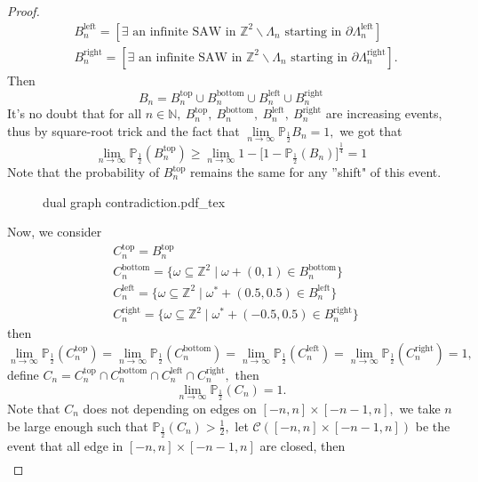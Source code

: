 \documentclass[12pt,a4paper]{report}
\theoremstyle{definition}
\newcommand{\incfig}[1]{%
{#1.pdf_tex}
}
\begin{document}
\begin{enumerate}
\begin{proof}
\begin{align*}
        &B_n^{\mathrm{left}}=[\exists\mbox{ an infinite SAW in }\mathbb{Z}^2\backslash\Lambda_n\mbox{ starting in }\partial\Lambda_n^\mathrm{left}]\\
        &B_n^{\mathrm{right}}=[\exists\mbox{ an infinite SAW in }\mathbb{Z}^2\backslash\Lambda_n\mbox{ starting in }\partial\Lambda_n^\mathrm{right}].
    \end{align*}
    Then
    \[
    B_n=B_n^{\mathrm{top}}\cup B_n^{\mathrm{bottom}}\cup B_n^{\mathrm{left}}\cup B_n^{\mathrm{right}}
    \]
	It's no doubt that for all $n\in\mathbb{N},\ B_n^{\mathrm{top}},\ B_n^{\mathrm{bottom}},\ B_n^{\mathrm{left}},\ B_n^{\mathrm{right}}$ are increasing events, thus by square-root trick and the fact that $\lim\limits_{n\to\infty}\mathbb{P}_{\frac{1}{2}}B_n=1,$ we got that
	\[
	\lim_{n\to\infty}\mathbb{P}_{\frac{1}{2}}(B_n^\mathrm{top})\geq\lim_{n\to\infty}1-\Big[1-\mathbb{P}_{\frac{1}{2}}(B_n)\Big]^\frac{1}{4}=1
	\]
	Note that the probability of $B_n^\mathrm{top}$ remains the same for any ''shift" of this event.
	\begin{figure}[htp]
	\centering
	\def\svgwidth{7cm}
	\incfig{dual graph contradiction}
	\end{figure}
	\newpage
	Now, we consider 
	\begin{align*}
        &C_n^{\mathrm{top}}=B_n^\mathrm{top}\\
        &C_n^{\mathrm{bottom}}=\{\omega\subseteq \mathbb{Z}^2\mid \omega+(0,1)\in B_n^\mathrm{bottom}\}\\
        &C_n^{\mathrm{left}}=\{\omega\subseteq \mathbb{Z}^2\mid \omega^*+(0.5,0.5)\in B_n^\mathrm{left}\}\\
        &C_n^{\mathrm{right}}=\{\omega\subseteq \mathbb{Z}^2\mid \omega^*+(-0.5,0.5)\in B_n^\mathrm{right}\}
	\end{align*}
	then
	\[
	\lim_{n\to\infty}\mathbb{P}_{\frac{1}{2}}(C_n^{\mathrm{top}})=\lim_{n\to\infty}\mathbb{P}_{\frac{1}{2}}(C_n^{\mathrm{bottom}})=\lim_{n\to\infty}\mathbb{P}_{\frac{1}{2}}(C_n^{\mathrm{left}})=\lim_{n\to\infty}\mathbb{P}_{\frac{1}{2}}(C_n^{\mathrm{right}})=1,
	\]
	define $C_n=C_n^{\mathrm{top}}\cap C_n^{\mathrm{bottom}}\cap C_n^{\mathrm{left}}\cap C_n^{\mathrm{right}},$ then
	\[
	\lim_{n\to\infty}\mathbb{P}_\frac{1}{2}(C_n)=1.
	\]
	Note that $C_n$ does not depending on edges on $[-n,n]\times [-n-1,n],$ we take $n$ be large enough such that $\mathbb{P}_\frac{1}{2}(C_n)>\frac{1}{2},$ let $\mathcal{C}([-n,n]\times [-n-1,n])$ be the event that all edge in $[-n,n]\times [-n-1,n]$ are closed, then
	\begin{align*}

\end{align*}
\end{proof}
\end{enumerate}
\end{document}
